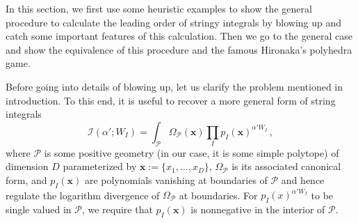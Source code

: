 \documentclass[12pt]{article}
\theoremstyle{definition}
\theoremstyle{plain}
\begin{document}
% 

In this section, we first use some heuristic examples 
to show the general procedure to calculate the leading order of stringy integrals
by blowing up and catch some important features of this calculation.
Then we go to the general case and show the equivalence of this procedure 
and the famous Hironaka's polyhedra game.

Before going into details of blowing up, let us clarify the problem mentioned in introduction. To this end, it is useful to recover a more general form of string integrals
\begin{equation*}
  \mathcal{I}(\alpha';W_{I})=\int_{\mathcal{P}} \Omega_{\mathcal{P}}(\mathbf{x}) \prod_{I}p_{I}(\mathbf{x})^{\alpha'W_{I}}\,,
\end{equation*}
where $\mathcal{P}$ is some positive geometry (in our case, it is some simple polytope) of dimension $D$ parameterized by $\mathbf{x}:= \{x_{1},\ldots,x_{D}\}$, $\Omega_{\mathcal{P}}$ is its associated canonical form, and $p_{I}(\mathbf{x})$ are polynomials vanishing at boundaries of $\mathcal{P}$ and hence regulate the logarithm divergence of $\Omega_{\mathcal{P}}$ at boundaries. For $p_{I}(x)^{\alpha' W_{I}}$ to be single valued in $\mathcal{P}$, we require that $p_{I}(\mathbf{x})$ is nonnegative in the interior of $\mathcal{P}$. %
\end{document}
